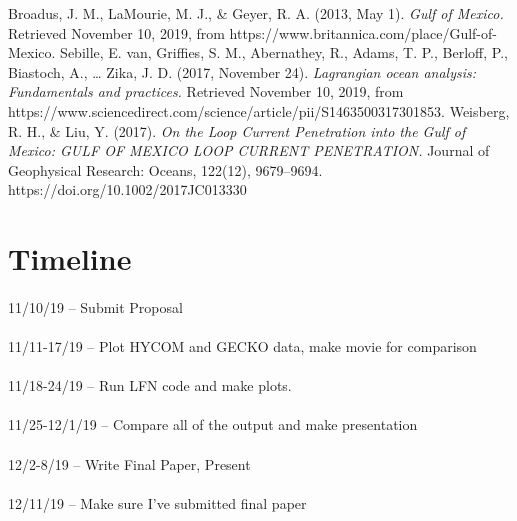 \documentclass{article}
\begin{document}
\begin{thebibliography}{1}

Broadus, J. M., LaMourie, M. J., & Geyer, R. A. (2013, May 1). {\em Gulf of Mexico.} Retrieved November 10, 2019, from https://www.britannica.com/place/Gulf-of-Mexico.
\bibitem{}
Sebille, E. van, Griffies, S. M., Abernathey, R., Adams, T. P., Berloff, P., Biastoch, A., … Zika, J. D. (2017, November 24). {\em Lagrangian ocean analysis: Fundamentals and practices.} Retrieved November 10, 2019, from https://www.sciencedirect.com/science/article/pii/S1463500317301853.
\bibitem{}
Weisberg, R. H., & Liu, Y. (2017). {\em On the Loop Current Penetration into the Gulf of Mexico: GULF OF MEXICO LOOP CURRENT PENETRATION.} Journal of Geophysical Research: Oceans, 122(12), 9679–9694. https://doi.org/10.1002/2017JC013330


\end{thebibliography}


\section{Timeline}
\paragraph{}11/10/19 – Submit Proposal
\paragraph{}11/11-17/19 – Plot HYCOM and GECKO data, make movie for comparison
\paragraph{}11/18-24/19 – Run LFN code and make plots.
\paragraph{}11/25-12/1/19 – Compare all of the output and make presentation
\paragraph{}12/2-8/19 – Write Final Paper, Present
\paragraph{}12/11/19 – Make sure I’ve submitted final paper
\paragraph{} 
\end{document}
